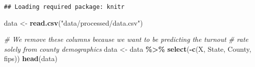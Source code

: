 \documentclass[
]{article}
\newenvironment{Shaded}{\begin{snugshade}}{\end{snugshade}}
\newcommand{\CommentTok}[1]{\textcolor[rgb]{0.56,0.35,0.01}{\textit{#1}}}
\newcommand{\FunctionTok}[1]{\textcolor[rgb]{0.13,0.29,0.53}{\textbf{#1}}}
\newcommand{\NormalTok}[1]{#1}
\newcommand{\OtherTok}[1]{\textcolor[rgb]{0.56,0.35,0.01}{#1}}
\newcommand{\SpecialCharTok}[1]{\textcolor[rgb]{0.81,0.36,0.00}{\textbf{#1}}}
\newcommand{\StringTok}[1]{\textcolor[rgb]{0.31,0.60,0.02}{#1}}
\begin{document}
\begin{verbatim}
## Loading required package: knitr
\end{verbatim}

\begin{Shaded}
\begin{Highlighting}[]
\NormalTok{data }\OtherTok{\textless{}{-}} \FunctionTok{read.csv}\NormalTok{(}\StringTok{"data/processed/data.csv"}\NormalTok{)}

\CommentTok{\# We remove these columns because we want to be predicting the turnout}
\CommentTok{\# rate solely from county demographics}
\NormalTok{data }\OtherTok{\textless{}{-}}\NormalTok{ data }\SpecialCharTok{\%\textgreater{}\%} \FunctionTok{select}\NormalTok{(}\SpecialCharTok{{-}}\FunctionTok{c}\NormalTok{(X, State, County, fips))}
\FunctionTok{head}\NormalTok{(data)}
\end{Highlighting}
\end{Shaded}
\end{document}
